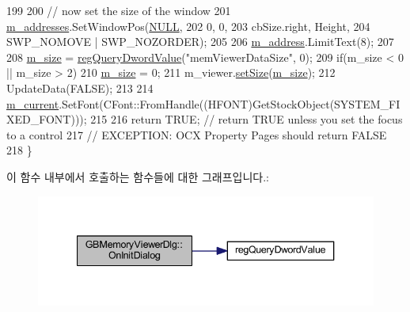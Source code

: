 \begin{DoxyCode}
199   
200   \textcolor{comment}{// now set the size of the window}
201   \mbox{\hyperlink{class_g_b_memory_viewer_dlg_af3cb69fc0a793bfb57e2abebbb300e4d}{m\_addresses}}.SetWindowPos(\mbox{\hyperlink{getopt1_8c_a070d2ce7b6bb7e5c05602aa8c308d0c4}{NULL}},
202                            0, 0,
203                            cbSize.right, Height,
204                            SWP\_NOMOVE | SWP\_NOZORDER);
205 
206   \mbox{\hyperlink{class_g_b_memory_viewer_dlg_abf9f9d9537192c37806951dc8b1f96c0}{m\_address}}.LimitText(8);
207 
208   \mbox{\hyperlink{class_g_b_memory_viewer_dlg_a9837ff346b59fb46c6b778a0adf8adf8}{m\_size}} = \mbox{\hyperlink{_reg_8cpp_a150640889ffff4851ee26d7b999ec7c3}{regQueryDwordValue}}(\textcolor{stringliteral}{"memViewerDataSize"}, 0);
209   \textcolor{keywordflow}{if}(m\_size < 0 || m\_size > 2)
210     \mbox{\hyperlink{class_g_b_memory_viewer_dlg_a9837ff346b59fb46c6b778a0adf8adf8}{m\_size}} = 0;
211   m\_viewer.\mbox{\hyperlink{class_memory_viewer_a185cb06e604ff1e0016b9be859c21387}{setSize}}(\mbox{\hyperlink{class_g_b_memory_viewer_dlg_a9837ff346b59fb46c6b778a0adf8adf8}{m\_size}});
212   UpdateData(FALSE);
213 
214   \mbox{\hyperlink{class_g_b_memory_viewer_dlg_a6348445a74339561b811824e2698d501}{m\_current}}.SetFont(CFont::FromHandle((HFONT)GetStockObject(SYSTEM\_FIXED\_FONT)));
215   
216   \textcolor{keywordflow}{return} TRUE;  \textcolor{comment}{// return TRUE unless you set the focus to a control}
217                 \textcolor{comment}{// EXCEPTION: OCX Property Pages should return FALSE}
218 \}
\end{DoxyCode}
이 함수 내부에서 호출하는 함수들에 대한 그래프입니다.\+:
\nopagebreak
\begin{figure}[H]
\begin{center}
\leavevmode
\includegraphics[width=340pt]{class_g_b_memory_viewer_dlg_a17f1561370d3e56e71044555399dc8de_cgraph}
\end{center}
\end{figure}
\mbox{\label{class_g_b_memory_viewer_dlg_ac81a1ae7e069e1db594879cddbd7b6d8}} 
